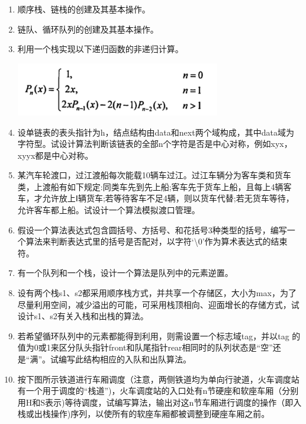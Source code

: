 \documentclass[lang=cn,newtx,10pt,scheme=chinese]{../../elegantbook}
\begin{document}
\begin{enumerate}
\def\labelenumii{\arabic{enumii}.}
\item
    顺序栈、链栈的创建及其基本操作。
  \vspace{5cm}
\item
    链队、循环队列的创建及其基本操作。
  \vspace{5cm}
\item
    利用一个栈实现以下递归函数的非递归计算。

    \includegraphics[width=3.50833in,height=0.91806in]{./images/image1.png}
  \vspace{5cm}
\item
    设单链表的表头指针为h，结点结构由data和next两个域构成，其中data域为字符型。试设计算法判断该链表的全部n个字符是否是中心对称，例如xyx，xyyx都是中心对称。
  \vspace{5cm}
\item
    某汽车轮渡口，过江渡船每次能载10辆车过江。过江车辆分为客车类和货车类，上渡船有如下规定:同类车先到先上船;客车先于货车上船，且每上4辆客车，才允许放上Ⅰ辆货车;若等待客车不足4辆，则以货车代替;若无货车等待，允许客车都上船。试设计一个算法模拟渡口管理。
  \vspace{5cm}
\item
    假设一个算法表达式包含圆括号、方括号、和花括号3种类型的括号，编写一个算法来判断表达式里的括号是否配对，以字符`\textbackslash0'作为算术表达式的结束符。
  \vspace{5cm}
\item
    有一个队列和一个栈，设计一个算法是队列中的元素逆置。
  \vspace{5cm}
\item
    设有两个栈s1、s2都采用顺序栈方式，并共享一个存储区，大小为max，为了尽量利用空间，减少溢出的可能，可采用栈顶相向、迎面增长的存储方式，试设计s1、s2有关入栈和出栈的算法。
  \vspace{5cm}
\item
    若希望循环队列中的元素都能得到利用，则需设置一个标志域tag，并以tag
    的值为0或1来区分队头指针front和队尾指针rear相同时的队列状态是``空''还是``满''。试编写此结构相应的入队和出队算法。
  \vspace{5cm}
\item
    按下图所示铁道进行车厢调度（注意，两侧铁道均为单向行驶道，火车调度站有一个用于调度的``栈道'')，火车调度站的入口处有n节硬座和软座车厢（分别用H和S表示)等待调度，试编写算法，输出对这n节车厢进行调度的操作（即入栈或出栈操作)序列，以使所有的软座车厢都被调整到硬座车厢之前。


\end{enumerate}
\end{document}
